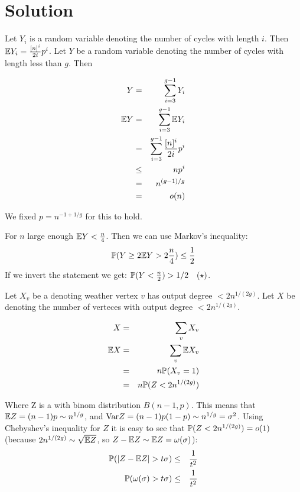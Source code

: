 \documentclass[a4paper]{article}
\begin{document}
\section{Solution}

Let $ Y_i $ is a random variable denoting the number of cycles with length
$ i $. Then $ \E Y_i = \frac{[n]^i}{2i}p^i $.
Let $ Y $ be a random variable denoting the number of cycles with length less than $ g $. Then

\begin{eqnarray*}
  Y &=& \sum_{i=3}^{g-1} Y_i \\
  \E Y &=& \sum_{i=3}^{g-1} \E Y_i \\
    &=& \sum_{i=3}^{g-1} \frac{[n]^i}{2i}p^i \\
    &\le& np^i \\
    &=& n^{(g-1)/g} \\
    &=& o(n) \\
\end{eqnarray*}

We fixed $ p = n^{-1 + 1/g} $ for this to hold.

For $ n $ large enough $ \E Y < \frac{n}{4} $. Then we can use Markov's inequality:
$$
  \P (Y \ge 2 \E Y > 2\frac{n}{4}) \le \frac{1}{2}
$$
If we invert the statement we get: $ \P(Y < \frac{n}{2}) > 1/2\quad (\star)$.

Let $ X_v $ be a \irv denoting weather vertex $ v $ has output degree $ < 2n^{1/(2g)} $.
Let $ X $ be \rv denoting the number of verteces with output degree $ < 2n^{1/(2g)} $.

\begin{eqnarray*}
  X &=& \sum_{v} X_v \\
  \E X &=& \sum_{v} \E X_v \\
    &=& n \P(X_v = 1) \\
    &=& n \P(Z < 2n^{1/(2g)})
\end{eqnarray*}

Where Z is a \rv with binom distribution $ B(n-1, p) $. This means that $ \E
Z = (n-1)p \sim n^{1/g} $, and $ \Var Z = (n-1)p(1 - p) \sim n^{1/g} = \sigma^2
$. Using Chebyshev's inequality for $ Z $ it is easy to see that $ \P(Z
< 2n^{1/(2g)}) = o(1) $ (because $ 2n^{1/(2g)} \sim \sqrt{\E Z} $, so $ Z - \E
Z \sim \E Z = \omega(\sigma) $):
\begin{eqnarray*}
  \P(|Z - \E Z| > t\sigma) &\le& \frac{1}{t^2} \\
  \P(\omega(\sigma) > t\sigma) &\le& \frac{1}{t^2} \\
\end{eqnarray*}
\end{document}
